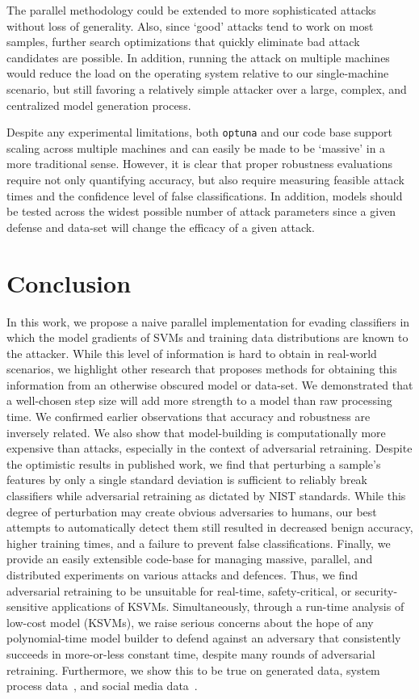 \documentclass[runningheads]{llncs}
\begin{document}
The parallel methodology could be extended to more sophisticated attacks without loss of generality. Also, since `good' attacks tend to work on most samples, further search optimizations that quickly eliminate bad attack candidates are possible. In addition, running the attack on multiple machines would reduce the load on the operating system relative to our single-machine scenario, but still favoring a relatively simple attacker over a large, complex, and centralized model generation process. 

Despite any experimental limitations, both \texttt{optuna} and our code base support scaling across multiple machines and can easily be made to be `massive' in a more traditional sense. However, it is clear that proper robustness evaluations require not only quantifying accuracy, but also require measuring feasible attack times and the confidence level of false classifications. In addition, models should be tested across the widest possible number of attack parameters since a given defense and data-set will change the efficacy of a given attack. 


\section{Conclusion}

In this work, we propose a naive parallel implementation for evading classifiers in which the model gradients of SVMs and training data distributions are known to the attacker. While this level of information is hard to obtain in real-world scenarios, we highlight other research that proposes methods for obtaining this information from an otherwise obscured model or data-set. We demonstrated that a   well-chosen step size will add more strength to a model than raw processing time. We confirmed earlier observations that accuracy and robustness are inversely related. We also show that model-building is computationally more expensive than attacks, especially in the context of adversarial retraining. Despite the optimistic results in published work, we find that perturbing a sample's features by only a single standard deviation is sufficient to reliably break classifiers while adversarial retraining as dictated by NIST standards\cite{falco2006using}. While this degree of perturbation may create obvious adversaries to humans, our best attempts to automatically detect them still resulted in decreased benign accuracy, higher training times, and a failure to prevent false classifications. Finally, we provide an easily extensible code-base for managing massive, parallel, and distributed experiments on various attacks and defences. Thus, we find adversarial retraining to be unsuitable for real-time, safety-critical, or security-sensitive applications of KSVMs. Simultaneously, through a run-time analysis of low-cost model (KSVMs), we raise serious concerns about the hope of any polynomial-time model builder to defend against an adversary that consistently succeeds in more-or-less constant time, despite many rounds of adversarial retraining. Furthermore, we show this to be true on generated data, system process data~\cite{kdd-nsl}, and social media data~\cite{truthseeker}.


\newpage

\newpage

\end{document}
